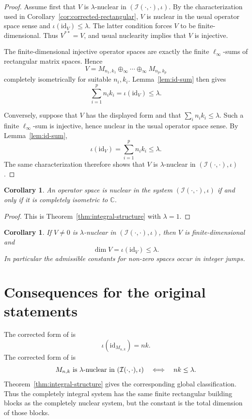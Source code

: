 \documentclass[11pt]{article}
\newtheorem{corollary}[theorem]{Corollary}
\theoremstyle{remark}
\newcommand{\id}{\mathrm{id}}
\newcommand{\CI}{\mathcal I}
\begin{document}
\begin{proof}
Assume first that \(V\) is \(\lambda\)-nuclear in
\((\CI(\cdot,\cdot),\iota)\).  By the characterization used in
Corollary~\ref{cor:corrected-rectangular}, \(V\) is nuclear in the usual
operator space sense and \(\iota(\id_V)\leq \lambda\).  The latter
condition forces \(V\) to be finite-dimensional.  Thus \(V^{**}=V\), and
usual nuclearity implies that \(V\) is injective.

The finite-dimensional injective operator spaces are exactly the finite
\(\ell_\infty\)-sums of rectangular matrix spaces.  Hence
\[
        V
        =
        M_{n_1,k_1}\oplus_\infty\cdots\oplus_\infty M_{n_p,k_p}
\]
completely isometrically for suitable \(n_i,k_i\).  Lemma~\ref{lem:id-sum}
then gives
\[
        \sum_{i=1}^{p} n_i k_i
        =
        \iota(\id_V)
        \leq \lambda.
\]

Conversely, suppose that \(V\) has the displayed form and that
\(\sum_i n_i k_i\leq \lambda\).  Such a finite \(\ell_\infty\)-sum is
injective, hence nuclear in the usual operator space sense.  By
Lemma~\ref{lem:id-sum},
\[
        \iota(\id_V)=\sum_{i=1}^{p}n_i k_i\leq\lambda.
\]
The same characterization therefore shows that \(V\) is
\(\lambda\)-nuclear in \((\CI(\cdot,\cdot),\iota)\).
\end{proof}

\begin{corollary}\label{cor:one-nuclear}
An operator space is nuclear in the system
\((\CI(\cdot,\cdot),\iota)\) if and only if it is completely isometric to
\(\mathbb C\).
\end{corollary}

\begin{proof}
This is Theorem~\ref{thm:integral-structure} with \(\lambda=1\).
\end{proof}

\begin{corollary}\label{cor:integer-jumps}
If \(V\neq 0\) is \(\lambda\)-nuclear in
\((\CI(\cdot,\cdot),\iota)\), then \(V\) is finite-dimensional and
\[
        \dim V=\iota(\id_V)\leq \lambda.
\]
In particular the admissible constants for non-zero spaces occur in
integer jumps.
\end{corollary}

\section{Consequences for the original statements}

The corrected form of \cite[Lemma 3.13]{DTZ} is
\[
        \iota(\id_{M_{n,k}})=nk.
\]
The corrected form of \cite[Theorem 3.14]{DTZ} is
\[
        M_{n,k}\hbox{ is }\lambda\hbox{-nuclear in }
        (\CI(\cdot,\cdot),\iota)
        \quad\Longleftrightarrow\quad
        nk\leq \lambda.
\]
Theorem~\ref{thm:integral-structure} gives the corresponding global
classification.  Thus the completely integral system has the same finite
rectangular building blocks as the completely nuclear system, but the
constant is the total dimension of those blocks.
\end{document}

